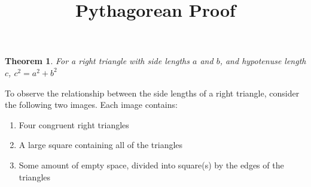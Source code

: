 \documentclass[11pt]{article}
\newtheorem{theorem}{Theorem}[section]
\theoremstyle{definition}
\begin{document}


\title{Pythagorean Proof}

\maketitle

\begin{theorem}\label{Pythagorean Formula}
  For a right triangle with side lengths $a$ and $b$, and hypotenuse length $c$,
  $c^{2} = a^{2} + b^{2}$
\end{theorem}

To observe the relationship between the side lengths of a right triangle, consider the following two images.
Each image contains:
\begin{enumerate}
  \item Four congruent right triangles
  \item A large square containing all of the triangles
  \item Some amount of empty space, divided into square(s) by the edges of the triangles
\end{enumerate}
\end{document}
